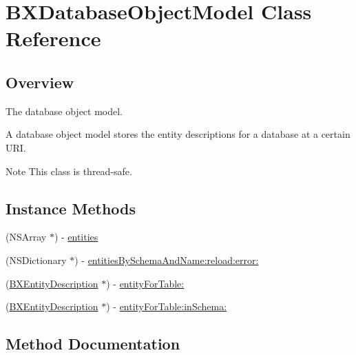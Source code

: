 \hypertarget{interface_b_x_database_object_model}{}\section{B\+X\+Database\+Object\+Model Class Reference}
\label{interface_b_x_database_object_model}


\subsection{Overview}
The database object model. 

A database object model stores the entity descriptions for a database at a certain U\+R\+I.

\begin{DoxyNote}{Note}
This class is thread-\/safe. 
\end{DoxyNote}
\subsection*{Instance Methods}
\begin{DoxyCompactItemize}
\item 
(N\+S\+Array $\ast$) -\/ \hyperlink{interface_b_x_database_object_model_a0f740cda8a4a174a1d911f81410900f8}{entities}
\item 
(N\+S\+Dictionary $\ast$) -\/ \hyperlink{interface_b_x_database_object_model_ac388762ca0b04d498f0def9d7e3e18eb}{entities\+By\+Schema\+And\+Name\+:reload\+:error\+:}
\item 
\hypertarget{interface_b_x_database_object_model_ada917c7ab034ad9d735dc89f716b5ec0}{}(\hyperlink{interface_b_x_entity_description}{B\+X\+Entity\+Description} $\ast$) -\/ \hyperlink{interface_b_x_database_object_model_ada917c7ab034ad9d735dc89f716b5ec0}{entity\+For\+Table\+:}\label{interface_b_x_database_object_model_ada917c7ab034ad9d735dc89f716b5ec0}

\item 
(\hyperlink{interface_b_x_entity_description}{B\+X\+Entity\+Description} $\ast$) -\/ \hyperlink{interface_b_x_database_object_model_a4dcd50aebdc1a3166fa6c76a84baf1a1}{entity\+For\+Table\+:in\+Schema\+:}
\end{DoxyCompactItemize}


\subsection{Method Documentation}
\hypertarget{interface_b_x_database_object_model_a0f740cda8a4a174a1d911f81410900f8}{}
